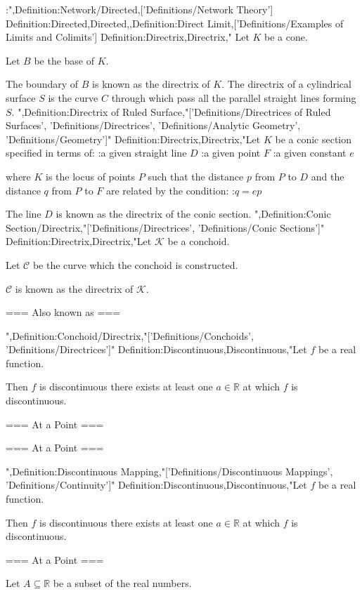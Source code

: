 :",Definition:Network/Directed,['Definitions/Network Theory']
Definition:Directed,Directed,,Definition:Direct Limit,['Definitions/Examples of Limits and Colimits']
Definition:Directrix,Directrix,"
Let $K$ be a cone.

Let $B$ be the base of $K$.


The boundary of $B$ is known as the directrix of $K$.
The directrix of a cylindrical surface $S$ is the curve $C$ through which pass all the parallel straight lines forming $S$.
",Definition:Directrix of Ruled Surface,"['Definitions/Directrices of Ruled Surfaces', 'Definitions/Directrices', 'Definitions/Analytic Geometry', 'Definitions/Geometry']"
Definition:Directrix,Directrix,"Let $K$ be a conic section specified in terms of:
:a given straight line $D$
:a given point $F$
:a given constant $e$

where $K$ is the locus of points $P$ such that the distance $p$ from $P$ to $D$ and the distance $q$ from $P$ to $F$ are related by the condition:
:$q = e p$


The line $D$ is known as the directrix of the conic section.
",Definition:Conic Section/Directrix,"['Definitions/Directrices', 'Definitions/Conic Sections']"
Definition:Directrix,Directrix,"Let $\mathcal K$ be a conchoid.

Let $\mathcal C$ be the curve  which the conchoid is constructed.


$\mathcal C$ is known as the directrix of $\mathcal K$.


=== Also known as ===

",Definition:Conchoid/Directrix,"['Definitions/Conchoids', 'Definitions/Directrices']"
Definition:Discontinuous,Discontinuous,"Let $f$ be a real function.

Then $f$ is discontinuous  there exists at least one $a \in \mathbb R$ at which $f$ is discontinuous.


=== At a Point ===

=== At a Point ===



",Definition:Discontinuous Mapping,"['Definitions/Discontinuous Mappings', 'Definitions/Continuity']"
Definition:Discontinuous,Discontinuous,"Let $f$ be a real function.

Then $f$ is discontinuous  there exists at least one $a \in \mathbb R$ at which $f$ is discontinuous.


=== At a Point ===

Let $A \subseteq \mathbb R$ be a subset of the real numbers.

